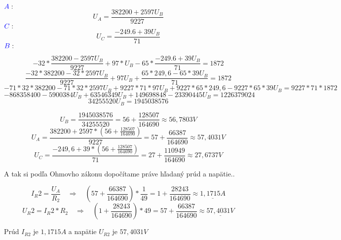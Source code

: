 \begin{flushleft}
${\color{blue}{A}}:\quad$ $$ U_A=\frac{382200+2597U_B}{9227}$$
${\color{blue}{C}}:\quad$ $$ U_C=\frac{-249.6+39U_B}{71}$$
${\color{blue}{B}}:$
\end{flushleft}
$$-32*\frac{382200-2597U_B}{9227}+97*U_B-65*\frac{-249.6+39U_B}{71}=1872$$
$$\frac{-32*382200-32*2597U_B}{9227}+97U_B+\frac{65*249,6-65*39U_B} {71}=1872$$
$$-71*32*382200-71*32*2597U_B+9227*71*97U_B+9227*65*249,6-9227*65*39U_B=9227*71*1872$$
$$-868358400-5900384U_B+63546349U_B+149698848-23390445U_B= 1226379024$$
$$34255520U_B=1945038576$$

$$U_B=\frac{1945038576}{34255520}=56+\frac{128507}{164690} \approx 56,7803V$$
$$U_A=\frac{382200+2597*(56+\frac{128507}{164690})}{9227}=57+\frac{66387}{164690} \approx 57,4031V$$
$$U_C=\frac{-249,6+39*(56+\frac{128507}{164690})}{71}=27+\frac{110949}{164690} \approx 27,6737V$$

\vspace{0.5cm}
A tak si podľa Ohmovho zákonu dopočítame práve hľadaný prúd a napätie..

\vspace{0.5cm}
$$I_R2=\frac{U_A}{R_2}\quad \Rightarrow \quad (57+\frac{66387}{164690})*\frac{1}{49}=1+\frac{28243}{164690}\approx\underline{1,1715A}$$
$$U_R2=I_R2*R_2\quad \Rightarrow \quad (1+\frac{28243}{164690})*49=57+\frac{66387}{164690} \approx \underline{57,4031V}$$

\vspace{0.5cm}
Prúd $I_{R2}$ je \underline{$1,1715A$} a napätie $U_{R2}$ je \underline{$57,4031V$} 